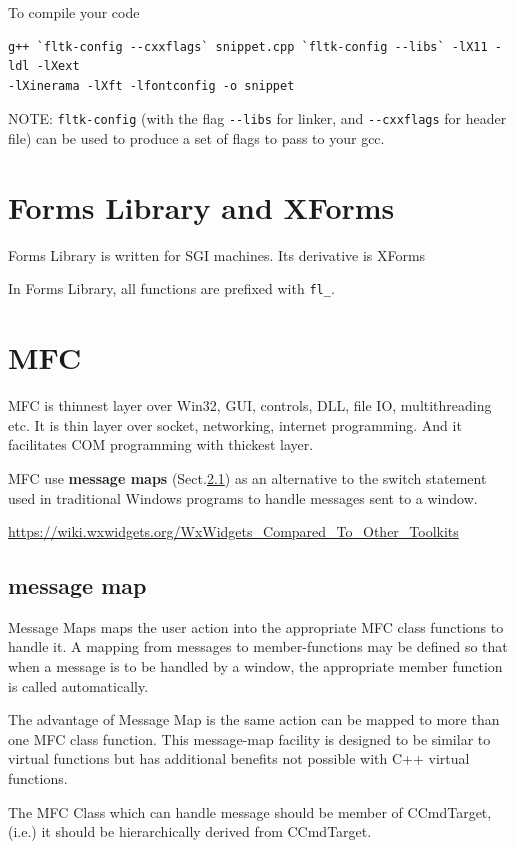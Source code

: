 To compile your code
\begin{verbatim}
g++ `fltk-config --cxxflags` snippet.cpp `fltk-config --libs` -lX11 -ldl -lXext
-lXinerama -lXft -lfontconfig -o snippet
\end{verbatim}
NOTE: \verb!fltk-config! (with the flag \verb!--libs! for linker, and
\verb!--cxxflags! for header file) can be used to produce a set of flags to pass
to your gcc.


\section{Forms Library and XForms}
\label{sec:Forms_Library}

Forms Library is written for SGI machines. Its derivative is XForms

In Forms Library, all functions are prefixed with \verb!fl_!.


\section{MFC}
\label{sec:MFC}

MFC is thinnest layer over Win32, GUI, controls, DLL, file IO, multithreading etc.
It is thin layer over socket, networking, internet programming.
And it facilitates COM programming with thickest layer.

MFC use {\bf message maps} (Sect.\ref{sec:message_map}) as an alternative to the
switch statement used in traditional Windows programs to handle messages sent to
a window.

\url{https://wiki.wxwidgets.org/WxWidgets_Compared_To_Other_Toolkits}

\subsection{message map}
\label{sec:message_map}

Message Maps maps the user action into the appropriate MFC class functions to handle it. 
A mapping from messages to member-functions may be defined so that when a
message is to be handled by a window, the appropriate member function is called
automatically.

The advantage of Message Map is the same action can be mapped to more than one
MFC class function.
This message-map facility is designed to be similar to virtual functions but has
additional benefits not possible with C++ virtual functions.

The MFC Class which can handle message should be member of CCmdTarget, (i.e.) it
should be hierarchically derived from CCmdTarget.


